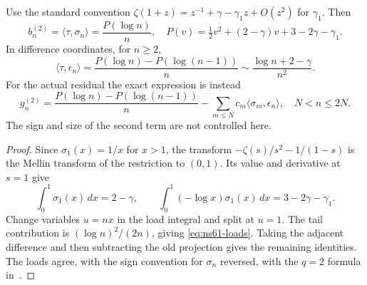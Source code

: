 \begin{proposition}
\label{prop:ns61-loads}
Use the standard convention
$\zeta(1+z)=z^{-1}+\gamma-\gamma_1z+O(z^2)$ for $\gamma_1$.
Then
\begin{equation}
 b_n^{(2)}=\langle\tau,\sigma_n\rangle
 =\frac{P(\log n)}n,
 \quad P(v)=\tfrac12v^2+(2-\gamma)v+3-2\gamma-\gamma_1.
 \label{eq:ns61-loads}
\end{equation}
In difference coordinates, for $n\geq2$,
\[
 \langle\tau,\epsilon_n\rangle
 =\frac{P(\log n)-P(\log(n-1))}{n}
 \sim\frac{\log n+2-\gamma}{n^2}.
\]
For the actual residual the exact expression is instead
\begin{equation}
 g_n^{(2)}=\frac{P(\log n)-P(\log(n-1))}{n}
       -\sum_{m\leq N}c_m\langle\sigma_m,\epsilon_n\rangle,
 \quad N<n\leq2N.
 \label{eq:ns61-retained-cross}
\end{equation}
The sign and size of the second term are not controlled here.
\end{proposition}
\begin{proof}
Since $\sigma_1(x)=1/x$ for $x>1$, the transform
$-\zeta(s)/s^2-1/(1-s)$ is the Mellin transform of the restriction
to $(0,1)$. Its value and derivative at $s=1$ give
\[
 \int_0^1\sigma_1(x)\,dx=2-\gamma,\qquad
 \int_0^1(-\log x)\sigma_1(x)\,dx=3-2\gamma-\gamma_1.
\]
Change variables $u=nx$ in the load integral and split at $u=1$.
The tail contribution is $(\log n)^2/(2n)$, giving
\eqref{eq:ns61-loads}. Taking the adjacent difference and then
subtracting the old projection gives the remaining identities.
The loads agree, with the sign convention for $\sigma_n$ reversed,
with the $q=2$ formula in~\cite{Ehm2024}.
\end{proof}

